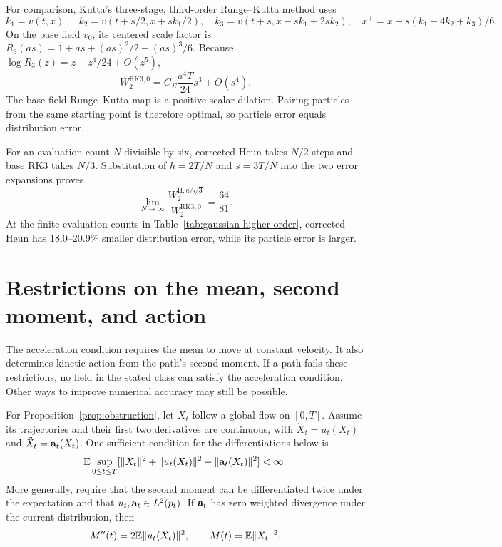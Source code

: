 For comparison, Kutta's three-stage, third-order Runge--Kutta method uses
\[
 k_1=v(t,x),\quad k_2=v(t+s/2,x+sk_1/2),\quad
 k_3=v(t+s,x-sk_1+2sk_2),\quad
 x^+=x+s(k_1+4k_2+k_3)/6.
\]
On the base field $v_0$, its centered scale factor is $R_3(as)=1+as+(as)^2/2+(as)^3/6$. Because $\log R_3(z)=z-z^4/24+O(z^5)$,
\[
 W_2^{\mathrm{RK3},0}=C_\Sigma\frac{a^4T}{24}s^3+O(s^4).
\]
The base-field Runge--Kutta map is a positive scalar dilation. Pairing particles from the same starting point is therefore optimal, so particle error equals distribution error.

For an evaluation count $N$ divisible by six, corrected Heun takes $N/2$ steps and base RK3 takes $N/3$. Substitution of $h=2T/N$ and $s=3T/N$ into the two error expansions proves
\[
 \lim_{N\to\infty}\frac{W_2^{\mathrm H,a/\sqrt3}}{W_2^{\mathrm{RK3},0}}=\frac{64}{81}.
\]
At the finite evaluation counts in Table~\ref{tab:gaussian-higher-order}, corrected Heun has 18.0--20.9\% smaller distribution error, while its particle error is larger.

\begin{table}[ht]
\centering

\caption{Corrected Heun has smaller distribution error but larger particle error than base-field RK3 at the listed evaluation counts. The parameters are those of Figure~\ref{fig:gaussian}, with $b=a/\sqrt3$ for Heun and $b=0$ for RK3. Both fields stay fixed as NFE increases.}
\label{tab:gaussian-higher-order}
\end{table}
\FloatBarrier

\section{Restrictions on the mean, second moment, and action}
\label{app:obstruction}

The acceleration condition requires the mean to move at constant velocity. It also determines kinetic action from the path's second moment. If a path fails these restrictions, no field in the stated class can satisfy the acceleration condition. Other ways to improve numerical accuracy may still be possible.

For Proposition~\ref{prop:obstruction}, let $X_t$ follow a global flow on $[0,T]$. Assume its trajectories and their first two derivatives are continuous, with $\dot X_t=u_t(X_t)$ and $\ddot X_t=\mathbf a_t(X_t)$. One sufficient condition for the differentiations below is
\begin{equation}
 \mathbb E\sup_{0\le t\le T}
 [\|X_t\|^2+\|u_t(X_t)\|^2+\|\mathbf a_t(X_t)\|^2]<\infty.
 \label{eq:moment-differentiation-assumption}
\end{equation}
More generally, require that the second moment can be differentiated twice under the expectation and that $u_t,\mathbf a_t\in L^2(p_t)$. If $\mathbf a_t$ has zero weighted divergence under the current distribution, then
\begin{equation}
 M''(t)=2\mathbb E\|u_t(X_t)\|^2,
 \qquad M(t)=\mathbb E\|X_t\|^2.
 \label{eq:moment-obstruction-full}
\end{equation}

